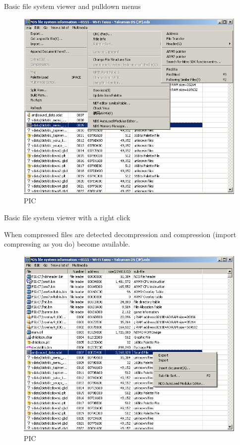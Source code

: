 \documentclass[
]{book}
\begin{document}
Basic file system viewer and pulldown menus

\begin{figure}
\centering
\includegraphics{images/221_home_fast6191_romhackingguide_unrenamed_fil___inal_borders_romhackguidecrystaltile2usage2.png}
\caption{PIC}
\end{figure}

Basic file system viewer with a right click

When compressed files are detected decompression and compression (import compressing as you do) become available.

\begin{figure}
\centering
\includegraphics{images/222_home_fast6191_romhackingguide_unrenamed_fil___inal_borders_romhackguidecrystaltile2usage3.png}
\caption{PIC}
\end{figure}
\end{document}
